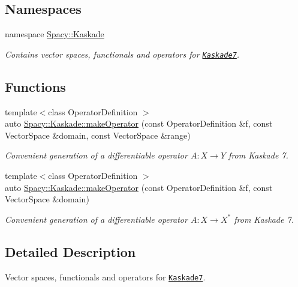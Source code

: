 \subsection*{\-Namespaces}
\begin{DoxyCompactItemize}
\item 
namespace \hyperlink{namespaceSpacy_1_1Kaskade}{\-Spacy\-::\-Kaskade}
\begin{DoxyCompactList}\small\item\em \-Contains vector spaces, functionals and operators for \href{http://www.zib.de/projects/kaskade7-finite-element-toolbox}{\tt \-Kaskade7}. \end{DoxyCompactList}\end{DoxyCompactItemize}
\subsection*{\-Functions}
\begin{DoxyCompactItemize}
\item 
{\footnotesize template$<$class Operator\-Definition $>$ }\\auto \hyperlink{group__KaskadeGroup_ga0e8d7d2c51e429e22561ef813fc97589}{\-Spacy\-::\-Kaskade\-::make\-Operator} (const \-Operator\-Definition \&f, const \-Vector\-Space \&domain, const \-Vector\-Space \&range)
\begin{DoxyCompactList}\small\item\em \-Convenient generation of a differentiable operator $A: X\rightarrow Y$ from \-Kaskade 7. \end{DoxyCompactList}\item 
{\footnotesize template$<$class Operator\-Definition $>$ }\\auto \hyperlink{group__KaskadeGroup_ga3afbd00437ea7bdb406f3d9a1f375522}{\-Spacy\-::\-Kaskade\-::make\-Operator} (const \-Operator\-Definition \&f, const \-Vector\-Space \&domain)
\begin{DoxyCompactList}\small\item\em \-Convenient generation of a differentiable operator $A: X\rightarrow X^*$ from \-Kaskade 7. \end{DoxyCompactList}\end{DoxyCompactItemize}


\subsection{\-Detailed \-Description}
\-Vector spaces, functionals and operators for \href{http://www.zib.de/projects/kaskade7-finite-element-toolbox}{\tt \-Kaskade7}. 

